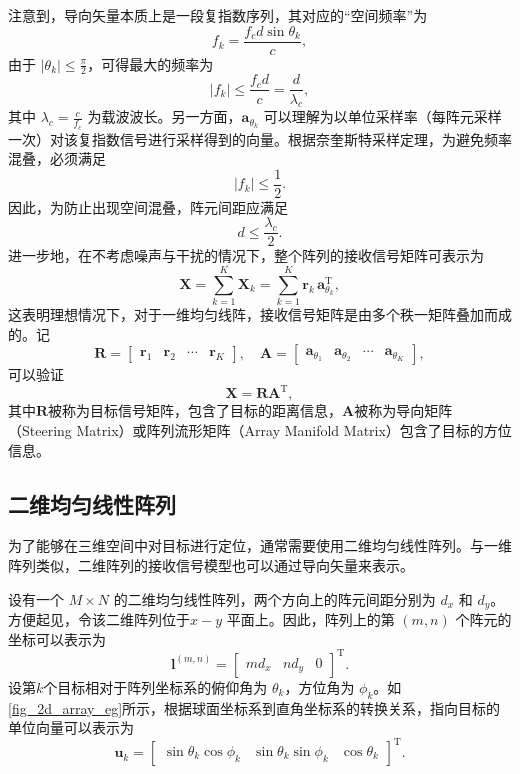 注意到，导向矢量本质上是一段复指数序列，其对应的``空间频率''为
\[
    f_k = \frac{f_c d \sin\theta_k}{c},
\]
由于 \( |\theta_k| \leq \tfrac{\pi}{2} \)，可得最大的频率为
\[
    |f_k| \leq \frac{f_c d}{c} = \frac{d}{\lambda_c},
\]
其中 \(\lambda_c = \tfrac{c}{f_c}\) 为载波波长。另一方面，\(\bm{a}_{\theta_k}\) 可以理解为以单位采样率（每阵元采样一次）对该复指数信号进行采样得到的向量。根据奈奎斯特采样定理，为避免频率混叠，必须满足
\[
    |f_k| \leq \frac{1}{2}.
\]
因此，为防止出现空间混叠，阵元间距应满足
\[
    d \leq \frac{\lambda_c}{2}.
\]
进一步地，在不考虑噪声与干扰的情况下，整个阵列的接收信号矩阵可表示为
\[
    \mathbf{X}
    = \sum_{k=1}^{K} \mathbf{X}_k
    = \sum_{k=1}^{K} \bm{r}_k \, \bm{a}_{\theta_k}^{\mathrm{T}},
\]
这表明理想情况下，对于一维均匀线阵，接收信号矩阵是由多个秩一矩阵叠加而成的。记
\[
    \mathbf{R} = \begin{bmatrix}
        \bm{r}_1 & \bm{r}_2 & \cdots & \bm{r}_K
    \end{bmatrix}, \quad \mathbf{A} = \begin{bmatrix}
        \bm{a}_{\theta_1} & \bm{a}_{\theta_2} & \cdots & \bm{a}_{\theta_K}
    \end{bmatrix},
\]
可以验证
\[
    \mathbf{X} = \mathbf{R} \mathbf{A}^{\mathrm{T}},
\]
其中\( \mathbf{R} \)被称为目标信号矩阵，包含了目标的距离信息，\( \mathbf{A} \)被称为导向矩阵（Steering Matrix）或阵列流形矩阵（Array Manifold Matrix）包含了目标的方位信息。

\subsection{二维均匀线性阵列}
为了能够在三维空间中对目标进行定位，通常需要使用二维均匀线性阵列。与一维阵列类似，二维阵列的接收信号模型也可以通过导向矢量来表示。

设有一个 \(M \times N\) 的二维均匀线性阵列，两个方向上的阵元间距分别为 \(d_x\) 和 \(d_y\)。方便起见，令该二维阵列位于\( x-y \) 平面上。因此，阵列上的第 \( (m,n) \) 个阵元的坐标可以表示为
\[
    \bm{l}^{(m, n)} = \begin{bmatrix}
        m d_x & n d_y & 0
    \end{bmatrix}^{\mathrm{T}}.
\]
设第\( k \)个目标相对于阵列坐标系的俯仰角为 \(\theta_k\)，方位角为 \(\phi_k\)。如\cref{fig_2d_array_eg}所示，根据球面坐标系到直角坐标系的转换关系，指向目标的单位向量可以表示为
\[
    \bm{u}_k = \begin{bmatrix}
        \sin\theta_k \cos\phi_k & \sin\theta_k \sin\phi_k & \cos\theta_k
    \end{bmatrix}^{\mathrm{T}}.
\]

